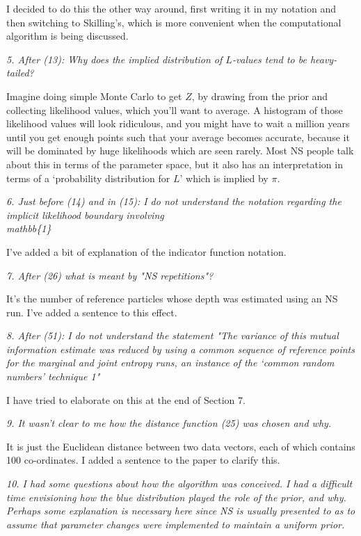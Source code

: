 \documentclass[a4paper, 12pt]{article}
\renewcommand{\quote}{\em \color{orange}}
\begin{document}
I decided to do this the other way around, first writing it in my notation and
then switching to Skilling's, which is more convenient when the computational
algorithm is being discussed.

{\quote
5. After (13): Why does the implied distribution of $L$-values tend to be heavy-tailed?}

Imagine doing simple Monte Carlo to get $Z$, by drawing from the prior and
collecting likelihood values, which you'll want to average. A histogram of
those likelihood values will look ridiculous, and you might have to wait
a million years until you get enough points such that your average becomes
accurate, because it will be dominated by huge likelihoods which are seen
rarely. Most NS people talk about this in terms of the parameter space, but
it also has an interpretation in terms of a `probability distribution for
$L$' which is implied by $\pi$.

{\quote
6. Just before (14) and in (15): I do not understand the notation regarding the implicit likelihood boundary involving \\mathbb\{1\}}

I've added a bit of explanation of the indicator function notation.

{\quote
7. After (26) what is meant by "NS repetitions"?}

It's the number of reference particles
whose depth was estimated using an NS run. I've added a sentence to this effect.

{\quote
8. After (51): I do not understand the statement "The variance of this mutual information estimate was reduced by using a common sequence of reference points for the marginal and joint entropy runs, an instance of the ‘common random numbers’ technique 1"}

I have tried to elaborate on this at the end of Section 7.

{\quote
9. It wasn't clear to me how the distance function (25) was chosen and why.}

It is just the Euclidean distance between two data vectors, each of which
contains 100 co-ordinates. I added a sentence to the paper to clarify this.

{\quote
10. I had some questions about how the algorithm was conceived.  I had a difficult time envisioning how the blue distribution played the role of the prior, and why.  Perhaps some explanation is necessary here since NS is usually presented to as to assume that parameter changes were implemented to maintain a uniform prior.}
\end{document}
